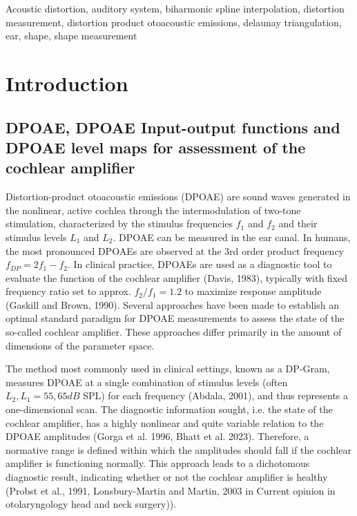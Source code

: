 \documentclass[journal,twoside,web]{ieeecolor2}
\begin{document}
\begin{IEEEkeywords}
Acoustic distortion,
auditory system,
biharmonic spline interpolation,
distortion measurement,
distortion product otoacoustic emissions,
delaunay triangulation,
ear,
shape,
shape measurement
\end{IEEEkeywords}

\section{Introduction}
\label{sec:introduction}
\subsection{DPOAE, DPOAE Input-output functions and DPOAE level maps for assessment of the cochlear amplifier}
Distortion-product otoacoustic emissions (DPOAE) are sound waves generated in the nonlinear, active cochlea through the intermodulation of two-tone stimulation, characterized by the stimulus frequencies $f_1$ and $f_2$ and their stimulus levels $L_1$ and $L_2$. DPOAE can be measured in the ear canal. In humans, the most pronounced DPOAEs are observed at the 3rd order product frequency $f_{DP} = 2f_1 - f_2$. In clinical practice, DPOAEs are used as a diagnostic tool to evaluate the function of the cochlear amplifier (Davis, 1983), typically with fixed frequency ratio set to approx. $f_2 / f_1 = 1.2$ to maximize response amplitude (Gaskill and Brown, 1990). Several approaches have been made to establish an optimal standard paradigm for DPOAE measurements to assess the state of the so-called cochlear amplifier. These approaches differ primarily in the amount of dimensions of the parameter space.

The method most commonly used in clinical settings, known as a DP-Gram, measures DPOAE at a single combination of stimulus levels (often $L_2, L_1 = 55, 65 dB$ SPL) for each frequency (Abdala, 2001), and thus represents a one-dimensional scan. The diagnostic information sought, i.e. the state of the cochlear amplifier, has a highly nonlinear and quite variable relation to the DPOAE amplitudes (Gorga et al. 1996, Bhatt et al. 2023). Therefore, a normative range is defined within which the amplitudes should fall if the cochlear amplifier is functioning normally. This approach leads to a dichotomous diagnostic result, indicating whether or not the cochlear amplifier is healthy (Probst et al., 1991, Lonsbury-Martin and Martin, 2003 in Current opinion in otolaryngology head and neck surgery)).
\end{document}
